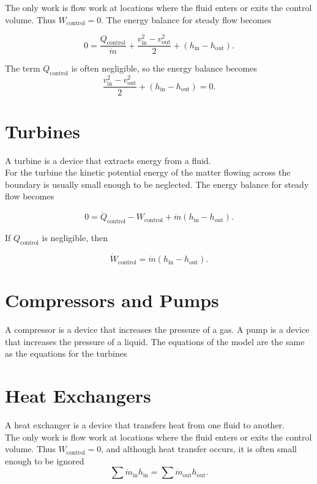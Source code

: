 \documentclass{report}
\begin{document}
The only work is flow work at locations where the fluid enters or exits the control volume. Thus $W_\text{control} = 0$. The energy balance for steady flow becomes

\[
	0 = \frac{Q_\text{control}}{\dot{m}} + \frac{v_\text{in}^2 - v_\text{out}^2}{2} + (h_\text{in} - h_\text{out})
	.\]

The term $Q_\text{control}$ is often negligible, so the energy balance becomes
\[
	\frac{v_\text{in}^2 - v_\text{out}^2}{2} + (h_\text{in} - h_\text{out}) = 0
	.\]

\section{Turbines}

A turbine is a device that extracts energy from a fluid.\\

For the turbine the kinetic potential energy of the matter flowing across the boundary is usually small enough to be neglected. The energy balance for steady flow becomes

\[
	0 = \dot{Q}_\text{control} - W_\text{control} + \dot{m}(h_\text{in} - h_\text{out})
	.\]

If $Q_\text{control}$ is negligible, then

\[
	\dot{W}_\text{control}  = \dot{m}(h_\text{in} - h_\text{out})
	.\]

\section{Compressors and Pumps}

A compressor is a device that increases the pressure of a gas. A pump is a device that increases the pressure of a liquid. The equations of the model are the same as the equations for the turbines

\section{Heat Exchangers}

A heat exchanger is a device that transfers heat from one fluid to another. \\

The only work is flow work at locations where the fluid enters or exits the control volume. Thus $W_\text{control} = 0$, and although heat transfer occurs, it is often small enough to be ignored
\[
	\sum \dot{m}_\text{in}h_\text{in} = \sum \dot{m}_\text{out}h_\text{out}
	.\]
\end{document}
